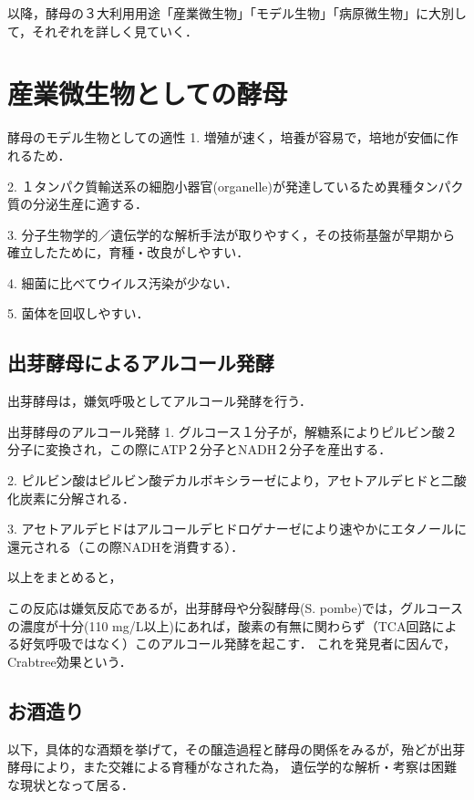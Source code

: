 \documentclass[uplatex, dvipdfmx]{jsarticle}
\begin{document}
以降，酵母の３大利用用途「産業微生物」「モデル生物」「病原微生物」に大別して，それぞれを詳しく見ていく．

\section{産業微生物としての酵母}

\begin{itembox}[l]{酵母のモデル生物としての適性}
    1. 増殖が速く，培養が容易で，培地が安価に作れるため．

    2. １タンパク質輸送系の細胞小器官(organelle)が発達しているため異種タンパク質の分泌生産に適する．

    3. 分子生物学的／遺伝学的な解析手法が取りやすく，その技術基盤が早期から確立したために，育種・改良がしやすい．

    4. 細菌に比べてウイルス汚染が少ない．

    5. 菌体を回収しやすい．
\end{itembox}

\subsection{出芽酵母によるアルコール発酵}

出芽酵母は，嫌気呼吸としてアルコール発酵を行う．

\begin{itembox}[l]{出芽酵母のアルコール発酵}
    1. グルコース１分子が，解糖系によりピルビン酸２分子に変換され，この際にATP２分子とNADH２分子を産出する．
    
    2. ピルビン酸はピルビン酸デカルボキシラーゼにより，アセトアルデヒドと二酸化炭素に分解される．

    3. アセトアルデヒドはアルコールデヒドロゲナーゼにより速やかにエタノールに還元される（この際NADHを消費する）．

    以上をまとめると，
\end{itembox}
この反応は嫌気反応であるが，出芽酵母や分裂酵母(S. pombe)では，グルコースの濃度が十分(110 mg/L以上\cite{Nanba})にあれば，酸素の有無に関わらず（TCA回路による好気呼吸ではなく）このアルコール発酵を起こす．
これを発見者に因んで，Crabtree効果という．

\subsection{お酒造り}

以下，具体的な酒類を挙げて，その醸造過程と酵母の関係をみるが，殆どが出芽酵母により，また交雑による育種がなされた為，
遺伝学的な解析・考察は困難な現状となって居る．
\end{document}
